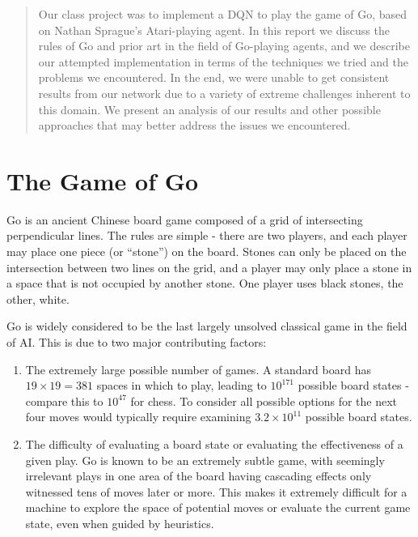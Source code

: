 
\begin{abstract}
Our class project was to implement a DQN to play the game of Go, based on Nathan Sprague's Atari-playing agent. In this report we discuss the rules of Go and prior art in the field of Go-playing agents, and we describe our attempted implementation in terms of the techniques we tried and the problems we encountered. In the end, we were unable to get consistent results from our network due to a variety of extreme challenges inherent to this domain. We present an analysis of our results and other possible approaches that may better address the issues we encountered.
\end{abstract}

\section{The Game of Go}

Go is an ancient Chinese board game composed of a grid of intersecting perpendicular lines. The rules are simple - there are two players, and each player may place one piece (or ``stone'') on the board. Stones can only be placed on the intersection between two lines on the grid, and a player may only place a stone in a space that is not occupied by another stone. One player uses black stones, the other, white.

Go is widely considered to be the last largely unsolved classical game in the field of AI. This is due to two major contributing factors:

\begin{enumerate}
\item The extremely large possible number of games. A standard board has $19\times 19=381$ spaces in which to play, leading to $10^{171}$ possible board states - compare this to $10^{47}$ for chess. To consider all possible options for the next four moves would typically require examining $3.2\times 10^{11}$ possible board states.
\item The difficulty of evaluating a board state or evaluating the effectiveness of a given play. Go is known to be an extremely subtle game, with seemingly irrelevant plays in one area of the board having cascading effects only witnessed tens of moves later or more. This makes it extremely difficult for a machine to explore the space of potential moves or evaluate the current game state, even when guided by heuristics.
\end{enumerate}

